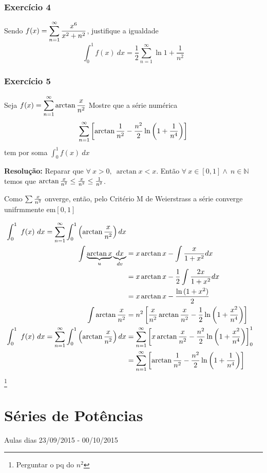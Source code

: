 \documentclass[12pt,openany]{book}
\newcommand{\soma}[2][n]{\sum_{{#1} = #2}^\infty}
\newcommand{\E}[1]{Exercício #1}
\newcommand{\cmw}{Critério M de Weierstrass }
\begin{document}
{\subsection*{\E{4}}{Sendo $\displaystyle{f(x) = \soma{1}  {x^6 \over x^2+n^2}}$, justifique a igualdade $$\int_0^1 f(x) \ dx = \frac{1}{2}\soma{1}\ln{1+ \frac{1}{n^2}}$$}

\subsection*{\E{5}}{Seja $\displaystyle{f(x) = \soma{1} \arctan {x \over n^2}}$ Mostre que a série numérica $$\soma{1} \left[ \arctan{1 \over n^2} - \frac{n^2}{2} \ln \left(1+\frac{1}{n^4}\right) \right]$$ tem por soma $\displaystyle{\int_0^1 f(x) \ dx}$ 

\textbf{Resolução:} Reparar que $\forall \ x > 0, \ \arctan{x} < x$. Então $\forall \ x \in [0,1] \land \ n \in \mathds{N}$ temos que $\arctan{x \over n^2} \leq {x \over n^2} \leq {1 \over n^2}$.\vspace{2mm}


Como $\sum{x \over n^2}$ onverge, então, pelo \cmw a série converge unifrmmente em$[0,1]$

\begin{align*}
\int_0^1 \ f(x) \ dx = \soma{1} \int_0^1 \left( \arctan{x \over n^2}\right)dx \\
\int \underbrace{\arctan{x}}_{u}\underbrace{dx}_{dv} &= x\arctan{x} - \int {x \over 1+x^2}dx \\
&= x \arctan{x} - \frac{1}{2}\int {2x \over 1+x^2}dx\\
&= x \arctan{x} - \frac{\ln{(1+x^2)}}{2}\\
\int \arctan{x \over n^2} &= n^2 \left[ {x \over n^2}\arctan{x \over n^2} - \frac{1}{2}\ln{\left(1 + {x^2 \over n^4}\right)}\right]\\
\int_0^1 \ f(x) \ dx = \soma{1} \int_0^1 \left( \arctan{x \over n^2}\right)dx &= \soma{1} \left[x \arctan{x \over n^2} - \frac{n^2}{2}\ln{\left(1 + {x^2 \over n^4}\right)} \right]_0^1 \\
&= \soma{1} \left[\arctan{1 \over n^2} - \frac{n^2}{2}\ln{\left(1 + {1 \over n^4}\right)} \right]
\end{align*}
\footnote{Perguntar o pq do $n^2$}

\chapter{Séries de Potências}{Aulas dias 23/09/2015 - 00/10/2015}
\label{chap:c5}

}}
\end{document}
